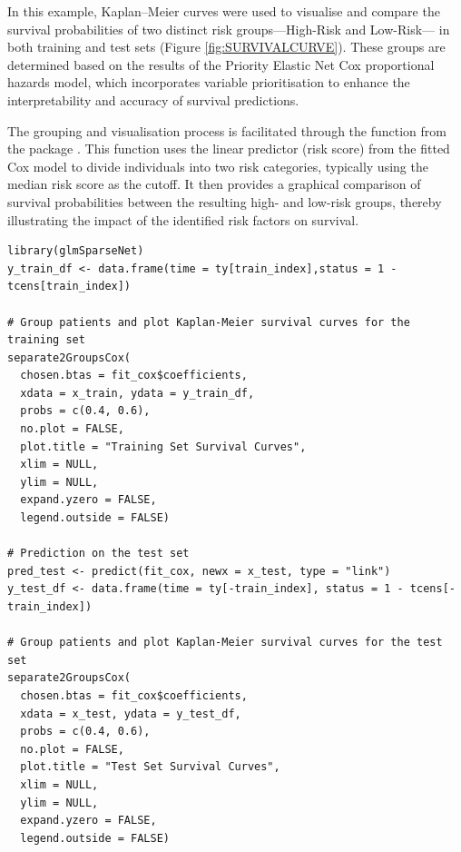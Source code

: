 In this example, Kaplan–Meier curves were used to visualise and compare the survival probabilities of two distinct risk groups—High-Risk and Low-Risk— in both training and test sets (Figure \ref{fig:SURVIVALCURVE}). These groups are determined based on the results of the Priority Elastic Net Cox proportional hazards model, which incorporates variable prioritisation to enhance the interpretability and accuracy of survival predictions. 

The grouping and visualisation process is facilitated through the  function from the  package \citep{Veríssimo2018glmSparseNet}. This function uses the linear predictor (risk score) from the fitted Cox model to divide individuals into two risk categories, typically using the median risk score as the cutoff. It then provides a graphical comparison of survival probabilities between the resulting high- and low-risk groups, thereby illustrating the impact of the identified risk factors on survival.
{\small
\begin{lstlisting}
library(glmSparseNet)
y_train_df <- data.frame(time = ty[train_index],status = 1 - tcens[train_index])

# Group patients and plot Kaplan-Meier survival curves for the training set
separate2GroupsCox(
  chosen.btas = fit_cox$coefficients,
  xdata = x_train, ydata = y_train_df,                
  probs = c(0.4, 0.6),               
  no.plot = FALSE,                   
  plot.title = "Training Set Survival Curves",
  xlim = NULL, 
  ylim = NULL, 
  expand.yzero = FALSE, 
  legend.outside = FALSE)

# Prediction on the test set
pred_test <- predict(fit_cox, newx = x_test, type = "link")
y_test_df <- data.frame(time = ty[-train_index], status = 1 - tcens[-train_index])

# Group patients and plot Kaplan-Meier survival curves for the test set
separate2GroupsCox(
  chosen.btas = fit_cox$coefficients,
  xdata = x_test, ydata = y_test_df,
  probs = c(0.4, 0.6),
  no.plot = FALSE,
  plot.title = "Test Set Survival Curves",
  xlim = NULL, 
  ylim = NULL, 
  expand.yzero = FALSE, 
  legend.outside = FALSE)
\end{lstlisting}
}

